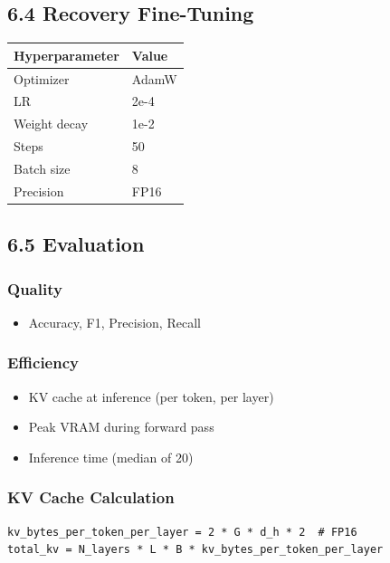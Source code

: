 \subsection{6.4 Recovery Fine-Tuning}

\begin{table}[H]
\centering
\small
\begin{tabular}{ll}
\toprule
\textbf{Hyperparameter} & \textbf{Value} \\
\midrule
Optimizer & AdamW \\
LR & 2e-4 \\
Weight decay & 1e-2 \\
Steps & 50 \\
Batch size & 8 \\
Precision & FP16 \\
\bottomrule
\end{tabular}
\end{table}

\subsection{6.5 Evaluation}

\subsubsection{Quality}
\begin{itemize}
\item Accuracy, F1, Precision, Recall
\end{itemize}

\subsubsection{Efficiency}
\begin{itemize}
\item KV cache at inference (per token, per layer)
\item Peak VRAM during forward pass
\item Inference time (median of 20)
\end{itemize}

\subsubsection{KV Cache Calculation}

\begin{lstlisting}
kv_bytes_per_token_per_layer = 2 * G * d_h * 2  # FP16
total_kv = N_layers * L * B * kv_bytes_per_token_per_layer
\end{lstlisting}

